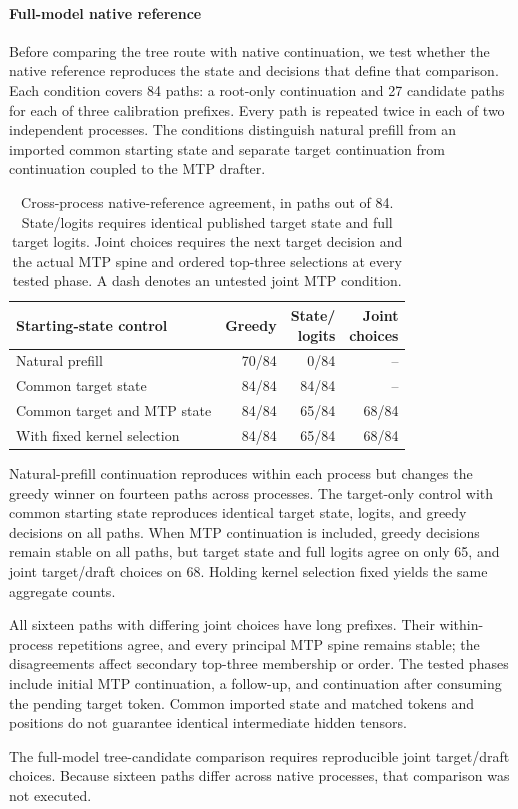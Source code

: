 \paragraph{Full-model native reference}
Before comparing the tree route with native continuation, we test whether the native reference reproduces the state and decisions that define that comparison. Each condition covers 84 paths: a root-only continuation and 27 candidate paths for each of three calibration prefixes. Every path is repeated twice in each of two independent processes. The conditions distinguish natural prefill from an imported common starting state and separate target continuation from continuation coupled to the MTP drafter.

\begin{table}[t]
\caption{Cross-process native-reference agreement, in paths out of 84. State/logits requires identical published target state and full target logits. Joint choices requires the next target decision and the actual MTP spine and ordered top-three selections at every tested phase. A dash denotes an untested joint MTP condition.}
\label{tab:native-continuation}
\centering\footnotesize
\setlength{\tabcolsep}{3pt}
\begin{tabularx}{\columnwidth}{@{}Xrrr@{}}
\toprule
Starting-state control & Greedy & \shortstack{State/\\logits} & \shortstack{Joint\\choices} \\
\midrule
Natural prefill & 70/84 & 0/84 & -- \\
Common target state & 84/84 & 84/84 & -- \\
Common target and MTP state & 84/84 & 65/84 & 68/84 \\
\quad With fixed kernel selection & 84/84 & 65/84 & 68/84 \\
\bottomrule
\end{tabularx}
\end{table}

Natural-prefill continuation reproduces within each process but changes the greedy winner on fourteen paths across processes. The target-only control with common starting state reproduces identical target state, logits, and greedy decisions on all paths. When MTP continuation is included, greedy decisions remain stable on all paths, but target state and full logits agree on only 65, and joint target/draft choices on 68. Holding kernel selection fixed yields the same aggregate counts.

All sixteen paths with differing joint choices have long prefixes. Their within-process repetitions agree, and every principal MTP spine remains stable; the disagreements affect secondary top-three membership or order. The tested phases include initial MTP continuation, a follow-up, and continuation after consuming the pending target token. Common imported state and matched tokens and positions do not guarantee identical intermediate hidden tensors.

The full-model tree-candidate comparison requires reproducible joint target/draft choices. Because sixteen paths differ across native processes, that comparison was not executed.
